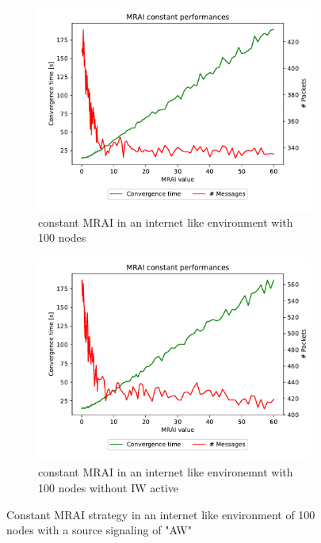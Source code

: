 \documentclass[10pt,conference,letterpaper]{IEEEtran}
\newcommand{\figwidth}{0.78}
\newcommand{\figvspace}{-1.5em}
\begin{document}
\begin{figure}[tb]
	\centering

	\begin{subfigure}{\columnwidth}
		\centering
		\includegraphics[width=\figwidth\columnwidth]{images/internet_like/S_AW/graph-100-constant/pareto-internet_like-constant_mrai_evolution.pdf}
		\caption{constant \ac{MRAI} in an internet like environment with \num{100} nodes}
		\label{fig:s_aw_constant_mrai_IW}
		\qquad
	\end{subfigure}

	\begin{subfigure}{\columnwidth}
		\centering
		\includegraphics[width=\figwidth\columnwidth]{images/internet_like/S_AW/graph-100-constant-noIW/pareto-internet_like-constant-noIW_mrai_evolution.pdf}
		\caption{constant \ac{MRAI} in an internet like environemnt with \num{100} nodes without IW active}
		\label{fig:s_aw_constant_mrai_noIW}
		\qquad
	\end{subfigure}

	\caption{Constant \ac{MRAI} strategy in an internet like environment of \num{100} nodes
			 with a source signaling of "AW"}
	\label{fig:s_aw_constant_mrai}
	\vspace{\figvspace}
\end{figure}
\end{document}
